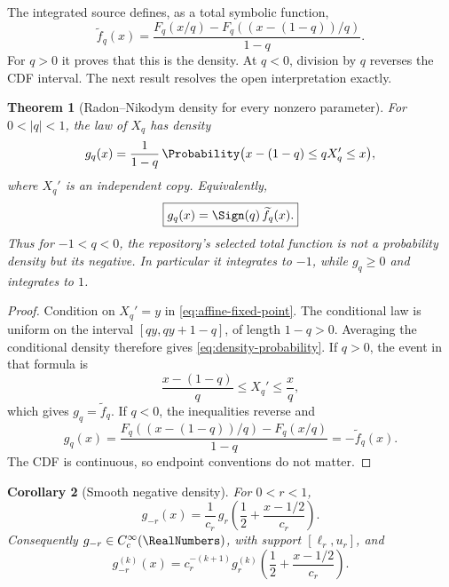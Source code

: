 \documentclass[11pt]{article}
\newtheorem{theorem}{Theorem}[section]
\newtheorem{corollary}[theorem]{Corollary}
\theoremstyle{definition}
\begin{document}
The integrated source defines, as a total symbolic function,
\begin{equation}
 \widetilde f_q(x)=
 \frac{F_q(x/q)-F_q((x-(1-q))/q)}{1-q}.                   \label{eq:source-selected-f}
\end{equation}
For \(q>0\) it proves that this is the density.  At \(q<0\), division by \(q\) reverses
the CDF interval.  The next result resolves the open interpretation exactly.

\begin{theorem}[Radon--Nikodym density for every nonzero parameter]\label{thm:all-sign-density}
For \(0<\lvert q\rvert<1\), the law of \(X_q\) has density
\begin{equation}
 g_q(x)=\frac{1}{1-q}\,
 \Probability\bigl(x-(1-q)\le qX_q'\le x\bigr),                  \label{eq:density-probability}
\end{equation}
where \(X_q'\) is an independent copy.  Equivalently,
\begin{equation}
 \boxed{
 g_q(x)=\Sign(q)\,\widetilde f_q(x).}                     \label{eq:density-sign}
\end{equation}
Thus for \(-1<q<0\), the repository's selected total function is not a probability
density but its negative.  In particular it integrates to \(-1\), while \(g_q\ge0\)
and integrates to \(1\).
\end{theorem}

\begin{proof}
Condition on \(X_q'=y\) in \cref{eq:affine-fixed-point}.  The conditional law is uniform
on the interval \([qy,qy+1-q]\), of length \(1-q>0\).  Averaging the conditional density
therefore gives \cref{eq:density-probability}.  If \(q>0\), the event in that formula is
\[
 \frac{x-(1-q)}q\le X_q'\le\frac xq,
\]
which gives \(g_q=\widetilde f_q\).  If \(q<0\), the inequalities reverse and
\[
 g_q(x)=\frac{F_q((x-(1-q))/q)-F_q(x/q)}{1-q}
       =-\widetilde f_q(x).
\]
The CDF is continuous, so endpoint conventions do not matter.
\end{proof}

\begin{corollary}[Smooth negative density]\label{cor:negative-density}
For \(0<r<1\),
\begin{equation}
 \boxed{
 g_{-r}(x)=\frac1{c_r}\,
 g_r\!\left(\frac12+\frac{x-1/2}{c_r}\right).}           \label{eq:negative-density}
\end{equation}
Consequently \(g_{-r}\in C_c^\infty(\RealNumbers)\), with support \([\ell_r,u_r]\), and
\begin{equation}
 g_{-r}^{(k)}(x)=c_r^{-(k+1)}
 g_r^{(k)}\!\left(\frac12+\frac{x-1/2}{c_r}\right).      \label{eq:negative-derivative}
\end{equation}
\end{corollary}
\end{document}
